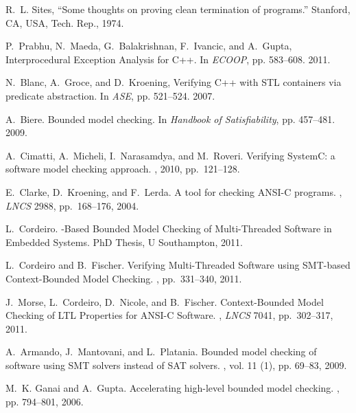 \documentclass[a4paper]{llncs}
\begin{document}
\vspace{-2.5ex}
\renewcommand\refname{{\normalsize References}}
{\begin{thebibliography}{10}
\vspace{-0.5ex}

R.~L. Sites, ``Some thoughts on proving clean termination of programs.''
  Stanford, CA, USA, Tech. Rep., 1974.
  
P.~Prabhu, N.~Maeda, G.~Balakrishnan, F.~Ivancic, and A.~Gupta,
\newblock Interprocedural Exception Analysis for C++.
\newblock In {\em ECOOP}, pp. 583--608. 2011.

N.~Blanc, A.~Groce, and D.~Kroening,
\newblock Verifying C++ with STL containers via predicate abstraction.
\newblock In {\em ASE}, pp. 521--524. 2007.

A.~Biere.
\newblock Bounded model checking.
\newblock In {\em Handbook of Satisfiability}, pp. 457--481. 2009.

A.~Cimatti, A.~Micheli, I.~Narasamdya, and M.~Roveri.
\newblock Verifying {SystemC}: a software model checking approach.
, 2010, pp.\ 121--128.

E.~Clarke, D.~Kroening, and F.~Lerda.
\newblock A tool for checking {ANSI-C} programs.
, {\em LNCS} 2988, pp.\ 168--176, 2004.

L.~Cordeiro.
-Based Bounded Model Checking of Multi-Threaded Software in 
Embedded Systems.
\newblock PhD Thesis, U Southampton, 2011.

L.~Cordeiro and B.~Fischer.
\newblock Verifying Multi-Threaded Software using {SMT}-based Context-Bounded 
Model Checking.
, pp.\ 331--340, 2011. 

J.~Morse, L.~Cordeiro, D.~Nicole, and B.~Fischer.
\newblock Context-Bounded Model Checking of LTL Properties for ANSI-C Software.
, {\em LNCS} 7041, pp.\ 302--317, 2011.

A.~Armando, J.~Mantovani, and L.~Platania.
\newblock Bounded model checking of software using {SMT} solvers instead of
  {SAT} solvers.
, vol. 11 (1), pp. 69--83, 2009.

M.~K. Ganai and A.~Gupta.
\newblock Accelerating high-level bounded model checking.
, pp. 794--801, 2006.


\end{thebibliography}}
\end{document}
